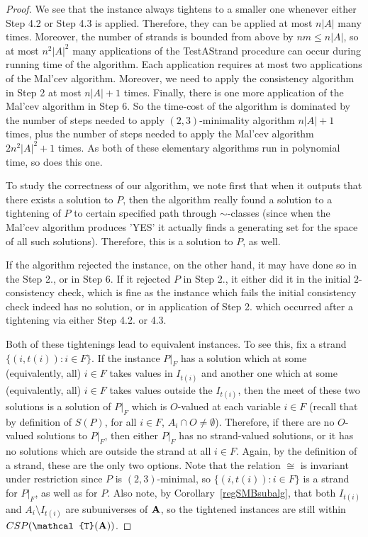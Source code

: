 \documentclass[11pt]{amsart}
\newcommand{\m}[1]{{\uppercase {\mathbf {#1}}}}
\newcommand{\vr}[1]{{\uppercase {\mathcal{#1}}}}
\theoremstyle{definition}
\begin{document}
\begin{proof}
We see that the instance always tightens to a smaller one whenever either Step 4.2 or Step 4.3 is applied. Therefore, they can be applied at most $n|A|$ many times. Moreover, the number of strands is bounded from above by $nm\leq n|A|$, so at most $n^2|A|^2$ many applications of the TestAStrand procedure can occur during running time of the algorithm. Each application requires at most two applications of the Mal'cev algorithm. Moreover, we need to apply the consistency algorithm in Step 2 at most $n|A|+1$ times. Finally, there is one more application of the Mal'cev algorithm in Step 6. So the time-cost of the algorithm is dominated by the number of steps needed to apply $(2,3)$-minimality algorithm $n|A|+1$ times, plus the number of steps needed to apply the Mal'cev algorithm $2n^2|A|^2+1$ times. As both of these elementary algorithms run in  polynomial time, so does this one.

To study the correctness of our algorithm, we note first that when it outputs that there exists a solution to $P$, then the algorithm really found a solution to a tightening of $P$ to certain specified path through $\sim$-classes (since when the Mal'cev algorithm produces 'YES' it actually finds a generating set for the space of all such solutions). Therefore, this is a solution to $P$, as well.

If the algorithm rejected the instance, on the other hand, it may have done so in the Step 2., or in Step 6. If it rejected $P$ in Step 2., it either did it in the initial $2$-consistency check, which is fine as the instance which fails the initial consistency check indeed has no solution, or in application of Step 2. which occurred after a tightening via either Step 4.2. or 4.3.

Both of these tightenings lead to equivalent instances. To see this, fix a strand $\{(i,t(i)):i\in F\}$. If the instance $P|_F$ has a solution which at some (equivalently, all) $i\in F$ takes values in $I_{t(i)}$ and another one which at some (equivalently, all) $i\in F$ takes values outside the $I_{t(i)}$, then the meet of these two solutions is a solution of $P|_F$ which is $O$-valued at each variable $i\in F$ (recall that by definition of $S(P)$, for all $i\in F$, $A_i\cap O\neq\emptyset$). Therefore, if there are no $O$-valued solutions to $P|_F$, then either $P|_F$ has no strand-valued solutions, or it has no solutions which are outside the strand at all $i\in F$. Again, by the definition of a strand, these are the only two options. Note that the relation $\cong$ is invariant under restriction since $P$ is $(2,3)$-minimal, so $\{(i,t(i)):i\in F\}$ is a strand for $P|_F$, as well as for $P$. Also note, by Corollary~\ref{regSMBsubalg}, that both $I_{t(i)}$ and $A_i\setminus I_{t(i)}$ are subuniverses of $\m a$, so the tightened instances are still within $CSP(\vr t(\m a))$.


\end{proof}
\end{document}
